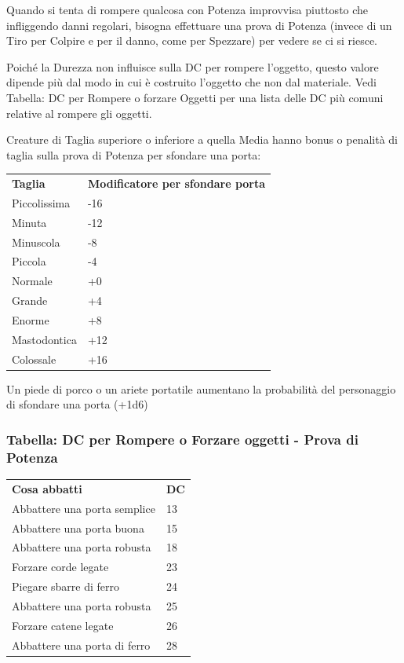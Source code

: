 \documentclass[a4paper,11pt,twoside,openany]{book}
\begin{document}
\label{rompere-oggetti}

Quando si tenta di rompere qualcosa con Potenza improvvisa piuttosto che infliggendo danni regolari, bisogna effettuare una prova di Potenza (invece di un Tiro per Colpire e per il danno, come per Spezzare) per vedere se ci si riesce.

Poiché la Durezza non influisce sulla DC per rompere l'oggetto, questo valore dipende più dal modo in cui è costruito l'oggetto che non dal materiale. Vedi Tabella: DC per Rompere o forzare Oggetti per una lista delle DC più comuni relative al rompere gli oggetti.

Creature di Taglia superiore o inferiore a quella Media hanno bonus o penalità di taglia sulla prova di Potenza per sfondare una porta:

\bigskip

\begin{tabular}{ll}
	\toprule
	\textbf{Taglia} & \textbf{Modificatore per sfondare porta}\\
	Piccolissima    & -16\\
	Minuta          & -12\\
	Minuscola       & -8\\
	Piccola         & -4\\
	Normale         & +0\\
	Grande          & +4\\
	Enorme          & +8\\
	Mastodontica    & +12\\
	Colossale       & +16\\
\end{tabular}

\bigskip

Un piede di porco o un ariete portatile aumentano la probabilità del personaggio di sfondare una porta (+1d6)

\subsubsection{Tabella: DC per Rompere o Forzare oggetti - Prova di Potenza}

\label{tabella-dc-per-rompere-o-forzare-oggetti---prova-di-potenza}
\bigskip

\begin{tabular}{ll}
	\toprule
	\textbf{Cosa abbatti}        & \textbf{DC}\\
	Abbattere una porta semplice & 13\\
	Abbattere una porta buona    & 15\\
	Abbattere una porta robusta  & 18\\
	Forzare corde legate         & 23\\
	Piegare sbarre di ferro      & 24\\
	Abbattere una porta robusta  & 25\\
	Forzare catene legate        & 26\\
	Abbattere una porta di ferro & 28\\
\end{tabular}
\bigskip
\end{document}
